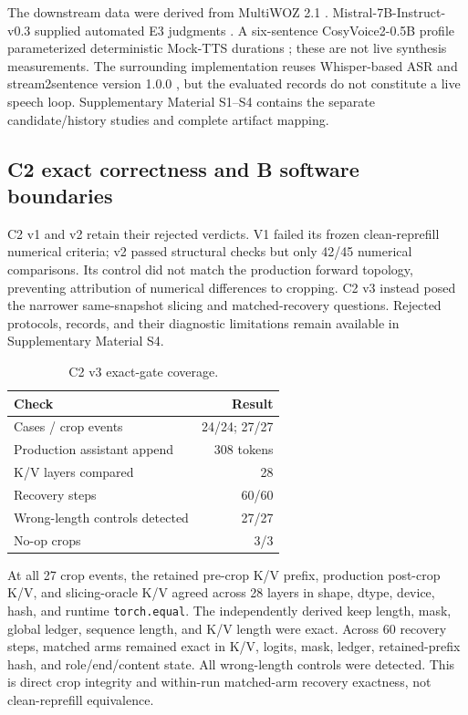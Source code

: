 The downstream data were derived from MultiWOZ 2.1 \citep{eric2020MultiWOZ21}. Mistral-7B-Instruct-v0.3 supplied automated E3 judgments \citep{jiang2023Mistral7B,mistralAI2024Mistral7BInstructV03}. A six-sentence CosyVoice2-0.5B profile parameterized deterministic Mock-TTS durations \citep{du2024CosyVoice2}; these are not live synthesis measurements. The surrounding implementation reuses Whisper-based ASR \citep{radford2023RobustSpeechRecognition} and stream2sentence version 1.0.0 \citep{beigel2026Stream2Sentence}, but the evaluated records do not constitute a live speech loop. Supplementary Material S1--S4 contains the separate candidate/history studies and complete artifact mapping.

\subsection{C2 exact correctness and B software boundaries}

C2 v1 and v2 retain their rejected verdicts. V1 failed its frozen clean-reprefill numerical criteria; v2 passed structural checks but only 42/45 numerical comparisons. Its control did not match the production forward topology, preventing attribution of numerical differences to cropping. C2 v3 instead posed the narrower same-snapshot slicing and matched-recovery questions. Rejected protocols, records, and their diagnostic limitations remain available in Supplementary Material S4.

\begin{table}[t]
\centering\small
\caption{C2 v3 exact-gate coverage.}
\label{tab:c2}
\begin{tabularx}{\linewidth}{@{}Yr@{}}
\toprule
Check & Result \\
\midrule
Cases / crop events & 24/24; 27/27 \\
Production assistant append & 308 tokens \\
K/V layers compared & 28 \\
Recovery steps & 60/60 \\
Wrong-length controls detected & 27/27 \\
No-op crops & 3/3 \\
\bottomrule
\end{tabularx}
\end{table}

At all 27 crop events, the retained pre-crop K/V prefix, production post-crop K/V, and slicing-oracle K/V agreed across 28 layers in shape, dtype, device, hash, and runtime \texttt{torch.equal}. The independently derived keep length, mask, global ledger, sequence length, and K/V length were exact. Across 60 recovery steps, matched arms remained exact in K/V, logits, mask, ledger, retained-prefix hash, and role/end/content state. All wrong-length controls were detected. This is direct crop integrity and within-run matched-arm recovery exactness, not clean-reprefill equivalence.

